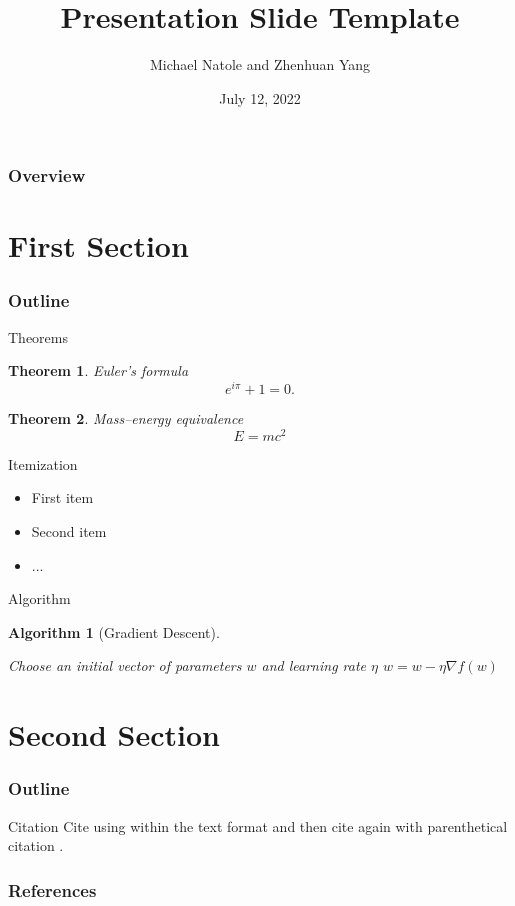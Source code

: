 \documentclass{beamer}
\title[Presentation]{Presentation Slide Template}
\author[MNZY]{Michael Natole and Zhenhuan Yang}
\institute[UAlbany]{Department of Mathematics \& Statistics\\University at Albany, SUNY}
\date{July 12, 2022}
\theoremstyle{mystyle}
\newtheorem{thm}{Theorem}
\newtheorem{code}{Algorithm}
\begin{document}
% 


\begin{frame}
	\titlepage
\end{frame}


\begin{frame}
	\frametitle{Overview}
	\tableofcontents
\end{frame}

\section[First]{First Section}

\begin{frame}
	\frametitle{Outline}
	\tableofcontents[currentsection]
\end{frame}

\begin{frame}{Theorems}
\begin{thm}\label{thm:euler}
Euler's formula
\[
	e^{i\pi} + 1 = 0.
\]
\end{thm}
\begin{thm}\label{thm:einstein}
Mass–energy equivalence
\[
	E = mc^2
\]
\end{thm}
\end{frame}

\begin{frame}{Itemization}
\begin{itemize}
\item First item 
\item Second item
\item ...	
\end{itemize}
	
\end{frame}

\begin{frame}{Algorithm}
\begin{code}[Gradient Descent]
\begin{algorithmic}[1]
\STATE Choose an initial vector of parameters $w$ and learning rate $\eta$
\STATE $w = w - \eta\nabla f(w)$
\ENDWHILE
\end{algorithmic}
\end{code}

\end{frame}


\section[Second]{Second Section}

\begin{frame}
	\frametitle{Outline}
	\tableofcontents[currentsection]
\end{frame}

\begin{frame}{Citation}
Cite \citet{anonymous} using within the text format and then cite again with parenthetical citation \citep{langley00}.

\end{frame}

\begin{frame}[allowframebreaks]
	\frametitle{References}
	
	{\footnotesize
	}
\end{frame}
\end{document}
